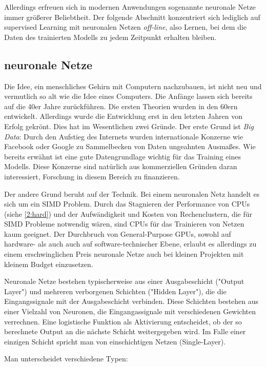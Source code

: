 	Allerdings erfreuen sich in modernen Anwendungen sogenannte neuronale Netze immer größerer Beliebtheit. Der folgende Abschnitt konzentriert sich lediglich auf supervised Learning mit neuronalen Netzen \textit{off-line}, also Lernen, bei dem die Daten des trainierten Modells zu jedem Zeitpunkt erhalten bleiben.
	
		\subsection{neuronale Netze}
		Die Idee, ein menschliches Gehirn mit Computern nachzubauen, ist nicht neu und vermutlich so alt wie die Idee eines Computers. Die Anfänge lassen sich bereits auf die 40er Jahre zurückführen. Die ersten Theorien wurden in den 60ern entwickelt. Allerdings wurde die Entwicklung erst in den letzten Jahren von Erfolg gekrönt. Dies hat im Wesentlichen zwei Gründe. Der erste Grund ist \textit{Big Data}: Durch den Aufstieg des Internets wurden internationale Konzerne wie Facebook oder Google zu Sammelbecken von Daten ungeahnten Ausmaßes. Wie bereits erwähnt ist eine gute Datengrundlage wichtig für das Training eines Modells. Diese Konzerne sind natürlich aus kommerziellen Gründen daran interessiert, Forschung in diesem Bereich zu finanzieren.
		
		Der andere Grund beruht auf der Technik. Bei einem neuronalen Netz handelt es sich um ein SIMD Problem. Durch das Stagnieren der \Gls{Performance} von CPUs (siehe \ref{2:hard}) und der Aufwändigkeit und Kosten von Rechenclustern, die für SIMD Probleme notwendig wären, sind CPUs für das Trainieren von Netzen kaum geeignet. Der Durchbruch von General-Purpose GPUs, sowohl auf hardware- als auch auch auf software-technischer Ebene, erlaubt es allerdings zu einem erschwinglichen Preis neuronale Netze auch bei kleinen Projekten mit kleinem Budget einzusetzen.
		
		Neuronale Netze bestehen typischerweise aus einer Ausgabeschicht ("Output Layer") und mehreren verborgenen Schichten ("Hidden Layer"), die die Eingangssignale mit der Ausgabeschicht verbinden. Diese Schichten bestehen aus einer Vielzahl von Neuronen, die Eingangassignale mit verschiedenen Gewichten verrechnen. Eine logistische Funktion als Aktivierung entscheidet, ob der so berechnete Output an die nächste Schicht weitergegeben wird. Im Falle einer einzigen Schicht spricht man von einschichtigen Netzen (Single-Layer). 
		
		Man unterscheidet verschiedene Typen:
		
